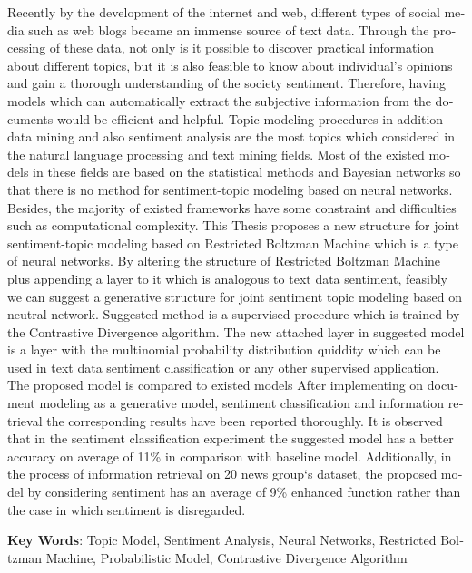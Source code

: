 \begin{latin}
	\begin{small}
		\baselineskip=0.6cm
Recently by the development of the internet and web, different types of social media such as web blogs became an immense source of text data. Through the processing of these data, not only is it possible to discover practical information about different topics, but it is also feasible to know about individual’s opinions and gain a thorough understanding of the society sentiment. Therefore, having models which can automatically extract the subjective information from the documents would be efficient and helpful. Topic modeling procedures in addition data mining and also sentiment analysis are the most topics which considered in the natural language processing and text mining fields. Most of the existed models in these fields are based on the statistical methods and Bayesian networks so that there is no method for sentiment-topic modeling based on neural networks. Besides, the majority of existed frameworks have some constraint and difficulties such as computational complexity. This Thesis proposes a new structure for joint sentiment-topic modeling based on Restricted Boltzman Machine which is a type of neural networks. By altering the structure of Restricted Boltzman Machine plus appending a layer to it which is analogous to text data sentiment, feasibly we can suggest a generative structure for joint sentiment topic modeling based on neutral network. Suggested method is a supervised procedure which is trained by the Contrastive Divergence algorithm. The new attached layer in suggested model is a layer with the multinomial probability distribution quiddity which can be used in text data sentiment classification or any other supervised application. The proposed model is compared to existed models After implementing on document modeling as a generative model, sentiment classification and information retrieval the corresponding results have been reported thoroughly. It is observed that in the sentiment classification experiment the suggested model has a better accuracy on average of 11\% in comparison with baseline model. Additionally, in the process of information retrieval on 20 news group‘s dataset, the proposed model by considering sentiment has an average of 9\% enhanced function rather than the case in which sentiment is disregarded. 
	
		
	\end{small}
	
	\vspace{0.5 cm}
	
	
	\noindent \textbf{Key Words}: Topic Model, Sentiment Analysis, Neural Networks, Restricted Boltzman Machine, Probabilistic Model, Contrastive Divergence Algorithm
\end{latin}

